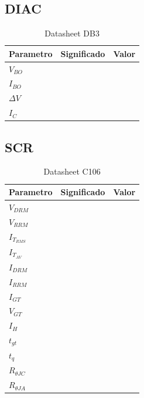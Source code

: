  
\subsection{DIAC}
\begin{table}[H]
  \begin{center}
    \begin{tabular}[c]{l|l|c}
      Parametro  &Significado &Valor \\
      \hline
      $V_{BO}$     &    &  \\
      $I_{BO}$     &    &  \\
      $\Delta V$   &    &  \\
      $I_C$        &    &  \\
    \end{tabular}
  \end{center}
\caption{Datasheet DB3}
\end{table}
\subsection{SCR}
\begin{table}[H]
  \begin{center}
    \begin{tabular}[c]{l|l|c}
      Parametro  &Significado &Valor \\
      \hline
      $V_{DRM}$           &    &  \\
      $V_{RRM}$           &    &  \\
      $I_{T_{RMS}}$       &    &  \\
      $I_{T_{AV}}$        &    &  \\
      $I_{DRM}$           &    &  \\
      $I_{RRM}$           &    &  \\
      $I_{GT}$            &    &  \\
      $V_{GT}$            &    &  \\
      $I_{H}$             &    &  \\
      $t_{gt}$            &    &  \\
      $t_{q}$             &    &  \\
      $R_{\theta JC}$     &    &  \\
      $R_{\theta JA}$     &    &  
    \end{tabular}
  \end{center}
\caption{Datasheet C106}
\end{table}
